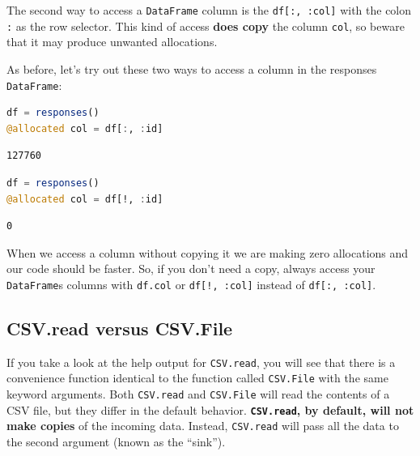 \documentclass[
  notoc %
]{tufte-book}
\newcommand{\passthrough}[1]{#1}
\begin{document}
The second way to access a \passthrough{\lstinline!DataFrame!} column is
the \passthrough{\lstinline!df[:, :col]!} with the colon
\passthrough{\lstinline!:!} as the row selector. This kind of access
\textbf{does copy} the column \passthrough{\lstinline!col!}, so beware
that it may produce unwanted allocations.

As before, let's try out these two ways to access a column in the
responses \passthrough{\lstinline!DataFrame!}:

\begin{lstlisting}[language=Julia]
df = responses()
@allocated col = df[:, :id]
\end{lstlisting}

\begin{lstlisting}
127760
\end{lstlisting}

\begin{lstlisting}[language=Julia]
df = responses()
@allocated col = df[!, :id]
\end{lstlisting}

\begin{lstlisting}
0
\end{lstlisting}

When we access a column without copying it we are making zero
allocations and our code should be faster. So, if you don't need a copy,
always access your \passthrough{\lstinline!DataFrame!}s columns with
\passthrough{\lstinline!df.col!} or
\passthrough{\lstinline"df[!, :col]"} instead of
\passthrough{\lstinline!df[:, :col]!}.

\hypertarget{sec:df_performance_csv_read_file}{%
\subsection{CSV.read versus
CSV.File}\label{sec:df_performance_csv_read_file}}

If you take a look at the help output for
\passthrough{\lstinline!CSV.read!}, you will see that there is a
convenience function identical to the function called
\passthrough{\lstinline!CSV.File!} with the same keyword arguments. Both
\passthrough{\lstinline!CSV.read!} and
\passthrough{\lstinline!CSV.File!} will read the contents of a CSV file,
but they differ in the default behavior.
\textbf{\passthrough{\lstinline!CSV.read!}, by default, will not make
copies} of the incoming data. Instead,
\passthrough{\lstinline!CSV.read!} will pass all the data to the second
argument (known as the ``sink'').
\end{document}
